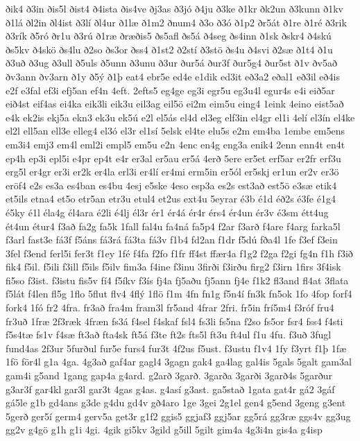 {ðik4
ð3in
ðis5l
ðist4
ð4ista
ðis4ve
ðj3as
ð3jó
ð4ju
ð3ke
ð1kr
ðk2un
ð3kunn
ð1kv
ð1lá
ðl2in
ðl4ist
ð3lí
ðl4ur
ð1læ
ð1m2
ðnum4
ð3o
ð3ó
ð1p2
ðr5át
ð1re
ð1ré
ð3rik
ð3rík
ð5ró
ðr1u
ð3rú
ð1ræ
ðræðis5
ðs5afl
ðs5á
ð4seg
ðs4inn
ð1sk
ðskr4
ð4skú
ðs5kv
ð4skö
ðs4lu
ð2so
ðs3or
ðss4
ð1st2
ð2stí
ð3stö
ðs4u
ð4svi
ð2sæ
ð1t4
ð1u
ð3uð
ð3ug
ð3ull
ð5uls
ð5unn
ð3unu
ð3ur
ður5á
ður3f
ður5g4
ður5st
ð1v
ðv5að
ðv3ann
ðv3arn
ð1y
ð5ý
ð1þ
eat4
ebr5e
ed4e
e1dik
ed3it
eð3a2
eðal1
eð3il
eð4is
e2f
e3fal
ef3i
efj5an
ef4n
4eft.
2efts5
eg4ge
eg3i
egr5u
eg3u4l
egur4s
e4i
eið5ar
eið4st
eif4as
ei4ka
eik3li
eik3u
eil3ag
eil5ö
ei2m
eim5u
eing4
1eink
4eino
eist5að
e4k
ek2is
ekj5a
ekn3
ek3u
ek5ú
e2l
el5ás
el4d
el3eg
elf3in
el4gr
el1i
4elí
el3ín
el4ke
el2l
ell5an
ell3e
elleg4
el3ó
el3r
el1sí
5elsk
el4te
elu5s
e2m
em4ba
1embe
em5ens
em3i4
emj3
em4l
eml2i
empl5
em5u
e2n
4enc
en4g
eng3a
enik4
2enn
enn4t
en4t
ep4h
ep3i
epl5i
e4pr
ep4t
e4r
er3al
er5au
er5á
4erð
5ere
er5et
erf5ar
er2fr
erf3u
erg5l
er4gr
er3i
er2k
er4la
erl3i
er4lí
er4mi
erm5in
er5ól
er5skj
er1un
er2v
er3ö
eröf4
e2s
es3a
es4ban
es4bu
4esj
e5ske
4eso
esp3a
es2s
est3að
est5ö
e3sæ
etik4
et5ils
etna4
et5o
etr5an
etr3u
etul4
et2us
ext4u
5eyrar
é3b
é1d
éð2s
é3fe
é1g4
é5ky
é1l
éla4g
él4ara
é2li
é4lj
él3r
ér1
ér4á
ér4r
érs4
ér4un
ér3v
é3sm
étt4ug
ét4un
étur4
f3að
fa2g
fa5k
1fall
fal4u
fa4ná
fa5p4
f2ar
f3arð
f4are
f4arg
farka5l
f3arl
fast3e
fá3f
f5áns
fá3rá
fá3ta
fá3v
f1b4
fd2an
f1dr
f5dú
fða4l
1fe
f3ef
f3ein
3fel
f3end
ferl5i
fer3t
f1ey
1fé
f4fa
f2fo
f1fr
ff4st
ffær4a
f1g2
f2ga
f2gi
fg4n
f1h
f3ið
fik4
f5il.
f5ili
f3ill
f5ils
f5ilv
fim3a
f4ine
f3inu
3firði
f3irðu
firg2
f3irn
1firs
3f4isk
fi5so
f3ist.
f3istu
fis5v
fí4
f5íkv
f3ís
fj4a
fj5aðu
fj5ann
fj4e
f1k2
fl3and
fl4at
3flata
f5lát
f4len
fl5g
1flo
5flut
flv4
4flý
1flö
f1m
4fn
fn1g
f5n4í
fn3k
fn5ok
1fo
4fop
forf4
fork4
1fó
fr2
4fra.
fr3að
fra4m
fram3l
fr5and
4frar
2fri.
fr5in
frí5m4
f3róf
fru4
fr3uð
1fræ
2f3ræk
4fræn
fs3á
f4sel
f4skaf
fsl4
fs3li
fs5na
f2so
fs5or
fsr4
fss4
f4sti
f5s4tæ
fs1v
f4sæ
ft3að
fta4sk
ft5á
f3te
ft2s
fts5l
ft3u
ft4ul
f1u
4fu.
f3uð
3fugl
fund4as
2f3ur
5furðul
fur5e
furs4
fur3t
4f2us
f5ust.
f3ustu
f1v4
1fy
f3yrt
f1þ
1fæ
1fö
för4l
g1a
4ga.
4g3að
gaf4ar
gagl4
3gagn
gak4
ga4lag
gal4is
5gals
5galt
gam3al
gam4i
g5and
1gang
gap4a
g4ard.
g2arð
3garð.
3garða
3garði
3garð4s
5garður
g3ar3f
gar4kl
gar3l
gar3t
4gas
g4as.
g4así
g3ast.
ga5stað
1gata
gat4r
gá2
3gáf
gá5le
g1b
gd4ans
g3de
g4du
gd4v
gð4aro
1ge
3gei
2g1el
gen4
g5end
3geng
g3ent
5gerð
ger5í
germ4
gerv5a
get3r
g1f2
ggis5
ggjaf3
ggj5ar
gg5rá
gg3ræ
ggs4v
gg3ug
gg2v
g4gö
g1h
g1i
4gi.
4gik
gi5kv
3gild
g5ill
5gilt
gim4a
4g3i4n
gis4a
g4isp
}
